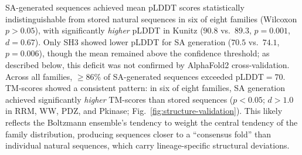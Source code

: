 SA-generated sequences achieved mean pLDDT scores statistically indistinguishable from stored natural sequences in six of eight families (Wilcoxon $p > 0.05$), with significantly \emph{higher} pLDDT in Kunitz ($90.8$ vs.\ $89.3$, $p{=}0.001$, $d{=}0.67$). Only SH3 showed lower pLDDT for SA generation ($70.5$ vs.\ $74.1$, $p{=}0.006$), though the mean remained above the confidence threshold; as described below, this deficit was not confirmed by AlphaFold2 cross-validation. Across all families, $\geq 86\%$ of SA-generated sequences exceeded pLDDT${=}70$. TM-scores showed a consistent pattern: in six of eight families, SA generation achieved significantly \emph{higher} TM-scores than stored sequences ($p < 0.05$; $d > 1.0$ in RRM, WW, PDZ, and Pkinase; Fig.~\ref{fig:structure-validation}). This likely reflects the Boltzmann ensemble's tendency to weight the central tendency of the family distribution, producing sequences closer to a ``consensus fold'' than individual natural sequences, which carry lineage-specific structural deviations.

